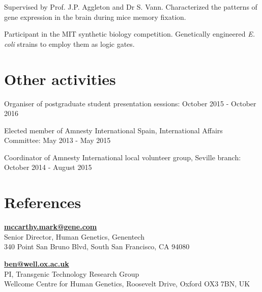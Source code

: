 \documentclass[letterpaper]{deedy-resume}
\begin{document}
\begin{minipage}[t]{0.99\textwidth}
	
	Supervised by Prof. J.P. Aggleton and Dr S. Vann. Characterized the patterns of gene expression in the brain during mice memory fixation.\\
	\smallsectionspace
	
	
	Participant in the MIT synthetic biology competition. Genetically engineered \textit{E. coli} strains to employ them as logic gates.
	\sectionspace 


\section{Other activities}

 \textbullet{} Organiser of postgraduate student presentation sessions: October 2015 - October 2016
 
  \textbullet{} Elected member of Amnesty International Spain, International Affairs Committee: May 2013 - May 2015
  
  \textbullet{} Coordinator of Amnesty International local volunteer group, Seville branch: October 2014 - August 2015
 
\sectionspace 


\section{References}


\href{mccarthy.mark@gene.com}{\textbf{mccarthy.mark@gene.com}} \\
Senior Director, Human Genetics, Genentech \\
340 Point San Bruno Blvd, South San Francisco, CA 94080\\
\smallsectionspace


\href{ben@well.ox.ac.uk}{\textbf{ben@well.ox.ac.uk}} \\
PI, Transgenic Technology Research Group \\
Wellcome Centre for Human Genetics, Roosevelt Drive, Oxford OX3 7BN, UK \\
\smallsectionspace

\sectionspace 
\end{minipage} 
\end{document}
